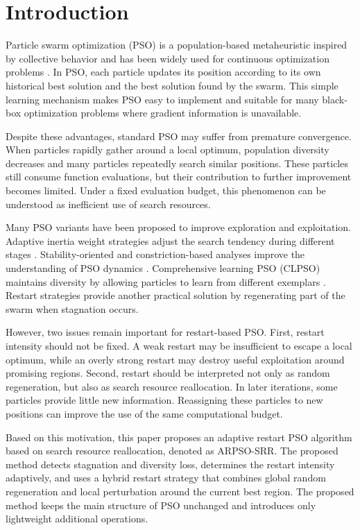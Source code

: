 \documentclass[conference]{IEEEtran}
\begin{document}
\section{Introduction}
Particle swarm optimization (PSO) is a population-based metaheuristic inspired by collective behavior and has been widely used for continuous optimization problems \cite{b1}. In PSO, each particle updates its position according to its own historical best solution and the best solution found by the swarm. This simple learning mechanism makes PSO easy to implement and suitable for many black-box optimization problems where gradient information is unavailable.

Despite these advantages, standard PSO may suffer from premature convergence. When particles rapidly gather around a local optimum, population diversity decreases and many particles repeatedly search similar positions. These particles still consume function evaluations, but their contribution to further improvement becomes limited. Under a fixed evaluation budget, this phenomenon can be understood as inefficient use of search resources.

Many PSO variants have been proposed to improve exploration and exploitation. Adaptive inertia weight strategies adjust the search tendency during different stages \cite{b2}. Stability-oriented and constriction-based analyses improve the understanding of PSO dynamics \cite{b3}. Comprehensive learning PSO (CLPSO) maintains diversity by allowing particles to learn from different exemplars \cite{b4}. Restart strategies provide another practical solution by regenerating part of the swarm when stagnation occurs.

However, two issues remain important for restart-based PSO. First, restart intensity should not be fixed. A weak restart may be insufficient to escape a local optimum, while an overly strong restart may destroy useful exploitation around promising regions. Second, restart should be interpreted not only as random regeneration, but also as search resource reallocation. In later iterations, some particles provide little new information. Reassigning these particles to new positions can improve the use of the same computational budget.

Based on this motivation, this paper proposes an adaptive restart PSO algorithm based on search resource reallocation, denoted as ARPSO-SRR. The proposed method detects stagnation and diversity loss, determines the restart intensity adaptively, and uses a hybrid restart strategy that combines global random regeneration and local perturbation around the current best region. The proposed method keeps the main structure of PSO unchanged and introduces only lightweight additional operations.
\end{document}
